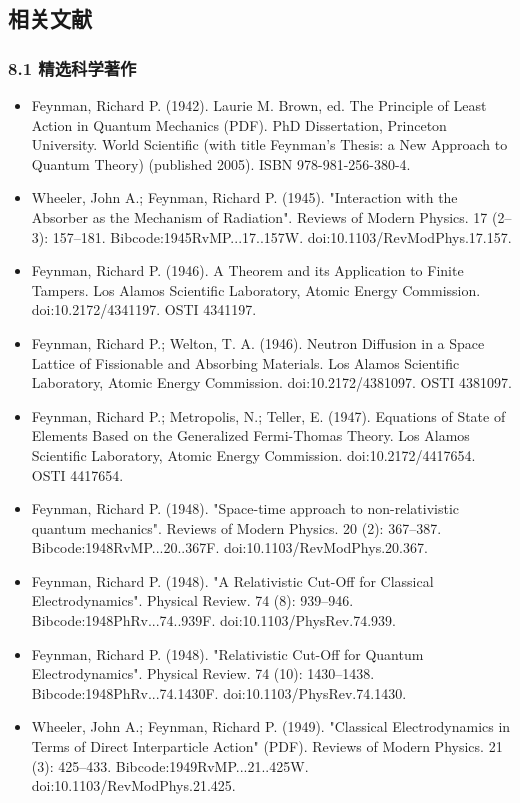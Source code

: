 \subsection{相关文献}
\subsubsection{8.1 精选科学著作}
\begin{itemize}
\item Feynman, Richard P. (1942). Laurie M. Brown, ed. The Principle of Least Action in Quantum Mechanics (PDF). PhD Dissertation, Princeton University. World Scientific (with title Feynman's Thesis: a New Approach to Quantum Theory) (published 2005). ISBN 978-981-256-380-4.
\item Wheeler, John A.; Feynman, Richard P. (1945). "Interaction with the Absorber as the Mechanism of Radiation". Reviews of Modern Physics. 17 (2–3): 157–181. Bibcode:1945RvMP...17..157W. doi:10.1103/RevModPhys.17.157.
\item Feynman, Richard P. (1946). A Theorem and its Application to Finite Tampers. Los Alamos Scientific Laboratory, Atomic Energy Commission. doi:10.2172/4341197. OSTI 4341197.
\item Feynman, Richard P.; Welton, T. A. (1946). Neutron Diffusion in a Space Lattice of Fissionable and Absorbing Materials. Los Alamos Scientific Laboratory, Atomic Energy Commission. doi:10.2172/4381097. OSTI 4381097.
\item Feynman, Richard P.; Metropolis, N.; Teller, E. (1947). Equations of State of Elements Based on the Generalized Fermi-Thomas Theory. Los Alamos Scientific Laboratory, Atomic Energy Commission. doi:10.2172/4417654. OSTI 4417654.
\item Feynman, Richard P. (1948). "Space-time approach to non-relativistic quantum mechanics". Reviews of Modern Physics. 20 (2): 367–387. Bibcode:1948RvMP...20..367F. doi:10.1103/RevModPhys.20.367.
\item Feynman, Richard P. (1948). "A Relativistic Cut-Off for Classical Electrodynamics". Physical Review. 74 (8): 939–946. Bibcode:1948PhRv...74..939F. doi:10.1103/PhysRev.74.939.
\item Feynman, Richard P. (1948). "Relativistic Cut-Off for Quantum Electrodynamics". Physical Review. 74 (10): 1430–1438. Bibcode:1948PhRv...74.1430F. doi:10.1103/PhysRev.74.1430.
\item Wheeler, John A.; Feynman, Richard P. (1949). "Classical Electrodynamics in Terms of Direct Interparticle Action" (PDF). Reviews of Modern Physics. 21 (3): 425–433. Bibcode:1949RvMP...21..425W. doi:10.1103/RevModPhys.21.425.

\end{itemize}
